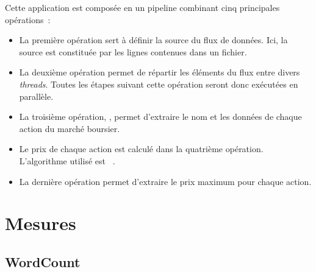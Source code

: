 Cette application est compos\'ee en un pipeline combinant cinq principales op\'erations~: 

\begin{itemize}

\item La premi\`ere op\'eration sert \`a d\'efinir la source du flux de donn\'ees. Ici, la source est constitu\'ee par les lignes contenues dans un fichier.




\item La deuxi\`eme op\'eration permet de r\'epartir les \'el\'ements du flux entre divers \emph{threads}.
Toutes les \'etapes suivant cette op\'eration seront donc ex\'ecut\'ees en parall\`ele.

\item La troisi\`eme op\'eration,  , permet d'extraire le nom et les donn\'ees de chaque action du march\'e boursier.


\item  Le prix de chaque action est calcul\'e dans la quatri\`eme op\'eration. L'algorithme utilis\'e est ~\cite{XSX}. 


\item La derni\`ere op\'eration permet d'extraire le prix maximum pour chaque action.


\end{itemize}


\section{Mesures}


\subsection{WordCount}

